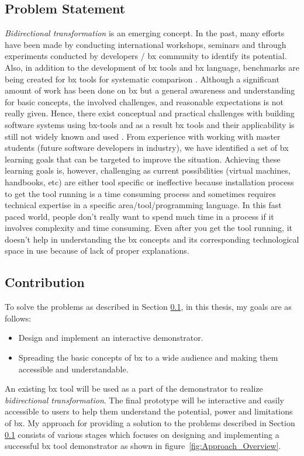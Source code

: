 \subsection{Problem Statement}\label{subsec:probstmt}
\textit{Bidirectional transformation} is an emerging concept. In the past, many efforts have been made by conducting international workshops, seminars and through experiments conducted by developers / bx community to identify its potential. Also, in addition to the development of bx tools and bx language, benchmarks are being created for bx tools for systematic comparison \cite{benchmark-BX}.
\newline\newline  Although a significant amount of work has been done on bx but a general awareness and understanding for basic concepts, the involved challenges, and reasonable expectations is not really given. Hence, there exist conceptual and practical challenges with building software systems using bx-tools and as a result bx tools and their applicability is still not widely known and used \cite{bx-theoryandappl}.
\newline\newline From experience with working with master students (future software developers in industry), we have identified a set of bx learning goals that can be targeted to improve the situation.
Achieving these learning goals is, however, challenging as current possibilities (virtual machines, handbooks, etc) are either tool specific or ineffective because installation process to get the tool running is a time consuming process and sometimes requires technical expertise in a specific area/tool/programming language. In this fast paced world, people don't really want to spend much time in a process if it involves complexity and time consuming. Even after you get the tool running, it doesn't help in understanding the bx concepts and its corresponding technological space in use because of lack of proper explanations.

\subsection{Contribution}\label{subsec:contribution}
To solve the problems as described in Section \ref{subsec:probstmt}, in this thesis, my goals are as follows:
\begin{itemize} 
\item {Design and implement an interactive demonstrator.} 
\item {Spreading the basic concepts of bx to a wide audience and making them accessible and understandable.}
\end{itemize}
An existing bx tool will be used as a part of the demonstrator to realize \textit{bidirectional transformation}. The final prototype will be interactive and easily accessible to users to help them understand the potential, power and limitations of bx.
\newline\newline My approach for providing a solution to the problems described in Section \ref{subsec:probstmt}  consists of various stages which focuses on designing and implementing a successful bx tool demonstrator as shown in figure~\ref{fig:Approach_Overview}. 

